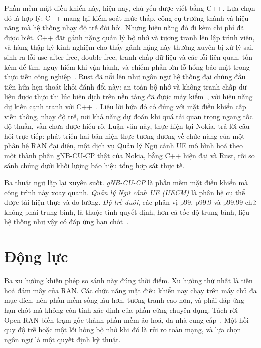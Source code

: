 Phần mềm mặt điều khiển này, hiện nay, chủ yếu được viết bằng C++. Lựa chọn đó là hợp lý:
C++ mang lại kiểm soát mức thấp, công cụ trưởng thành và hiệu năng mà hệ thống nhạy độ trễ
đòi hỏi. Nhưng hiệu năng đó đi kèm chi phí đã được biết. C++ đặt gánh nặng quản lý bộ nhớ và
tương tranh lên lập trình viên, và hàng thập kỷ kinh nghiệm cho thấy gánh nặng này thường
xuyên bị xử lý sai, sinh ra lỗi use-after-free, double-free, tranh chấp dữ liệu và các lỗi
liên quan, tốn kém để tìm, nguy hiểm khi vận hành, và chiếm phần lớn lỗ hổng bảo mật trong
thực tiễn công nghiệp~\cite{msrc2019memory,google2022android}. Rust đã nổi lên như ngôn ngữ
hệ thống đại chúng đầu tiên hứa hẹn thoát khỏi đánh đổi này: an toàn bộ nhớ và không tranh
chấp dữ liệu được thực thi lúc biên dịch trên nền tảng đã được máy
kiểm~\cite{klabnik2023rust,jung2018rustbelt}, với hiệu năng dự kiến cạnh tranh với
C++~\cite{balasubramanian2017rust}. Liệu lời hứa đó có đúng với mặt điều khiển cấp viễn thông,
nhạy độ trễ, nơi khả năng dự đoán khi quá tải quan trọng ngang tốc độ thuần, vẫn chưa được
hiểu rõ. Luận văn này, thực hiện tại Nokia, trả lời câu hỏi trực tiếp: phát triển hai bản hiện
thực tương đương về chức năng của một phân hệ RAN đại diện, một dịch vụ Quản lý Ngữ cảnh UE
mô hình hoá theo một thành phần gNB-CU-CP thật của Nokia, bằng C++ hiện đại và Rust, rồi so
sánh chúng dưới khối lượng báo hiệu tổng hợp sát thực tế.


Ba thuật ngữ lặp lại xuyên suốt. \emph{gNB-CU-CP} là phần mềm mặt điều khiển mà công trình này
xoay quanh. \emph{Quản lý Ngữ cảnh UE (UECM)} là phân hệ cụ thể được tái hiện thực và đo
lường. \emph{Độ trễ đuôi}, các phân vị p99, p99.9 và p99.99 chứ không phải trung bình, là thuộc
tính quyết định, hơn cả tốc độ trung bình, liệu hệ thống như vậy có đáp ứng hạn
chót~\cite{dean2013tail,barroso2017microseconds}.



\section{Động lực}\label{sec:motivation}
Ba xu hướng khiến phép so sánh này đúng thời điểm. Xu hướng thứ nhất là tiến hoá đám mây của
RAN. Các chức năng mặt điều khiển nay chạy trên máy chủ đa mục đích, nên phần mềm sống lâu
hơn, tương tranh cao hơn, và phải đáp ứng hạn chót mà không còn tính xác định của phần cứng
chuyên dụng. Tách rời Open-RAN biến trạm gốc thành phần mềm ảo hoá, đa nhà
cung cấp~\cite{polese2023oran}. Một hồi quy độ trễ hoặc một lỗi hỏng bộ nhớ khi đó là rủi ro
toàn mạng, và lựa chọn ngôn ngữ là một quyết định kỹ thuật.

